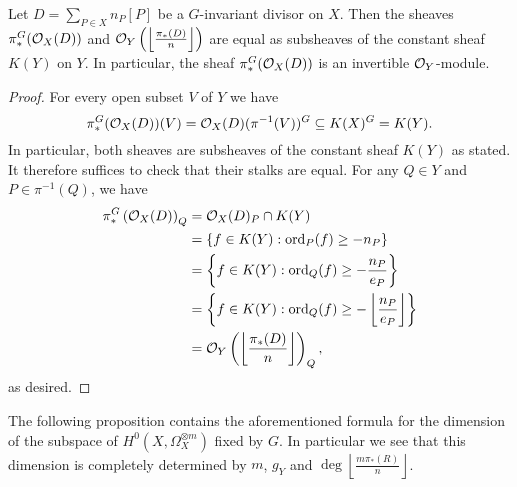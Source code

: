     \begin{lem}
    Let $D=\sum_{P\in X}n_P[P]$ be a $G$-invariant divisor on $X$.
    Then the sheaves $\pi_*^G({\cal O}_X(D))$ and ${\cal O}_Y\left(\left\lfloor \frac{\pi_*(D)}{n}\right \rfloor\right)$ are equal as subsheaves of the constant sheaf $K(Y)$ on $Y$. 
    In particular, the sheaf $\pi_*^G({\cal O}_X(D))$ is an invertible ${\cal O}_Y$-module.
    \end{lem}
    \begin{proof}
    For every open subset $V$ of $Y$ we have 
        \[
        \pi_*^G({\cal O}_X(D))(V) = {\cal O}_X(D) (\pi^{-1}(V))^G \subseteq K(X)^G = K(Y).
        \]
    In particular, both sheaves are subsheaves of the constant sheaf $K(Y)$ as stated. 
    It therefore suffices to check that their stalks are equal. 
    For any $Q \in Y$ and $P \in \pi^{-1}(Q)$, we have
        \begin{align*}
        \pi_*^G\left({\cal O}_X(D)\right)_Q & = {\cal O}_X(D)_P \cap K(Y) \\
        &= \left\{f \in K(Y): \operatorname{ord}_P(f) \ge -n_P\right\}\\
        &= \left\{f \in K(Y): \operatorname{ord}_Q(f) \ge - \frac{n_P}{e_P}\right\}\\
        &= \left\{ f \in K(Y): \operatorname{ord}_Q(f) \ge - \left\lfloor\frac{n_P}{e_P} \right\rfloor \right\}\\
        &= {\cal O}_Y\left(\left\lfloor \frac{\pi_*(D)}{n} \right\rfloor\right)_Q,
        \end{align*}
    as desired.
    \end{proof}

The following proposition contains the aforementioned formula for the dimension of the subspace of $H^0(X,\Omega_X^{\otimes m})$ fixed by $G$.
In particular we see that this dimension is completely determined by $m$, $g_Y$ and $\deg \left\lfloor \frac{m\pi_*(R)}{n} \right\rfloor$.

